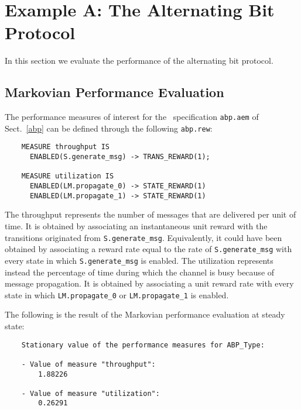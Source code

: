 \section{Example A: The Alternating Bit Protocol}

In this section we evaluate the performance of the alternating bit protocol.


\subsection{Markovian Performance Evaluation}

The performance measures of interest for the \aemilia\ specification {\tt abp.aem} of Sect.~\ref{abp} can be
defined through the following {\tt abp.rew}:

        \begin{verbatim}
    MEASURE throughput IS
      ENABLED(S.generate_msg) -> TRANS_REWARD(1);

    MEASURE utilization IS
      ENABLED(LM.propagate_0) -> STATE_REWARD(1)
      ENABLED(LM.propagate_1) -> STATE_REWARD(1)
        \end{verbatim}

\noindent The throughput represents the number of messages that are delivered per unit of time. It is
obtained by associating an instantaneous unit reward with the transitions originated from
{\tt S.generate\_msg}. Equivalently, it could have been obtained by associating a reward rate equal to the
rate of {\tt S.generate\_msg} with every state in which {\tt S.generate\_msg} is enabled. The utilization
represents instead the percentage of time during which the channel is busy because of message propagation.
It is obtained by associating a unit reward rate with every state in which {\tt LM.propagate\_0} or
{\tt LM.propagate\_1} is enabled.

The following is the result of the Markovian performance evaluation at steady state:

        \begin{verbatim}
    Stationary value of the performance measures for ABP_Type:

    - Value of measure "throughput":
        1.88226

    - Value of measure "utilization":
        0.26291
        \end{verbatim}

